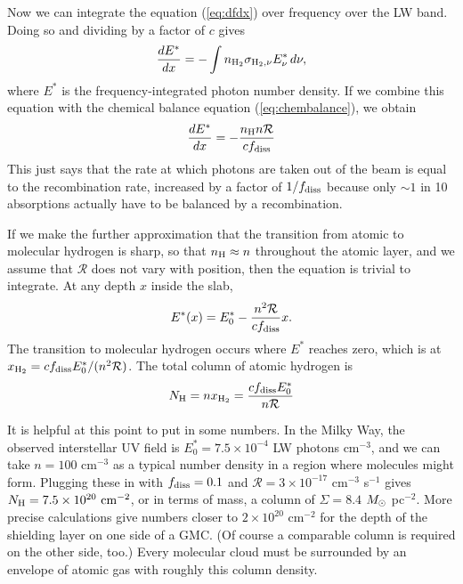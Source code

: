 Now we can integrate the equation (\ref{eq:dfdx}) over frequency over the LW band. Doing so and dividing by a factor of $c$ gives
\begin{equation}
\frac{dE^*}{dx} = -\int n_{{\rm H}_2} \sigma_{{\rm H}_2,\nu} E^*_{\nu}\, d\nu,
\end{equation}
where $E^*$ is the frequency-integrated photon number density. If we combine this equation with the chemical balance equation (\ref{eq:chembalance}), we obtain
\begin{equation}
\frac{dE^*}{dx} = -\frac{n_{\rm H} n \mathcal{R}}{c f_{\rm diss}}
\end{equation}
This just says that the rate at which photons are taken out of the beam is equal to the recombination rate, increased by a factor of $1/f_{\rm diss}$ because only $\sim 1$ in 10 absorptions actually have to be balanced by a recombination.

If we make the further approximation that the transition from atomic to molecular hydrogen is sharp, so that $n_{\rm H}\approx n$ throughout the atomic layer, and we assume that $\mathcal{R}$ does not vary with position, then the equation is trivial to integrate. At any depth $x$ inside the slab,
\begin{equation}
E^*(x) = E^*_0 - \frac{n^2\mathcal{R}}{c f_{\rm diss}} x.
\end{equation}
The transition to molecular hydrogen occurs where $E^*$ reaches zero, which is at $x_{{\rm H}_2}= c f_{\rm diss} E^*_0 / (n^2 \mathcal{R})$. The total column of atomic hydrogen is
\begin{equation}
N_{\rm H} = nx_{{\rm H}_2} = \frac{c f_{\rm diss} E^*_0}{n\mathcal{R}}
\end{equation}

It is helpful at this point to put in some numbers. In the Milky Way, the observed interstellar UV field is $E^*_0=7.5\times 10^{-4}$ LW photons cm$^{-3}$, and we can take $n=100$ cm$^{-3}$ as a typical number density in a region where molecules might form. Plugging these in with $f_{\rm diss}=0.1$ and $\mathcal{R}=3\times 10^{-17}$ cm$^{-3}$ s$^{-1}$ gives $N_{\rm H} = 7.5\times 10^{20}\mbox{ cm}^{-2}$, or in terms of mass, a column of $\Sigma=8.4$ $M_{\odot}$ pc$^{-2}$. More precise calculations give numbers closer to $2\times 10^{20}$ cm$^{-2}$ for the depth of the shielding layer on one side of a GMC. (Of course a comparable column is required on the other side, too.) Every molecular cloud must be surrounded by an envelope of atomic gas with roughly this column density.

